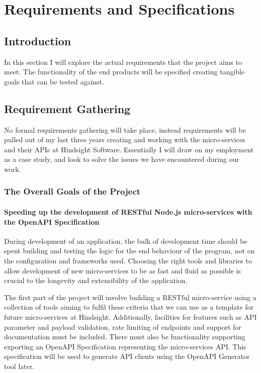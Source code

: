 \chapter{Requirements and Specifications}

\section{Introduction}
In this section I will explore the actual requirements that the project aims to meet. The functionality of the end products will be specified creating tangible goals that can be tested against.
\section{Requirement Gathering}
No formal requirements gathering will take place, instead requirements will be pulled out of my last three years creating and working with the micro-services and their APIs at Hindsight Software. Essentially I will draw on my employment as a case study, and look to solve the issues we have encountered during our work.

\subsection{The Overall Goals of the Project}

\subsubsection{Speeding up the development of RESTful Node.js micro-services with the OpenAPI Specification}
During development of an application, the bulk of development time should be spent building and testing the logic for the end behaviour of the program, not on the configuration and frameworks used. Choosing the right tools and libraries to allow development of new micro-services to be as fast and fluid as possible is crucial to the longevity and extensibility of the application.

The first part of the project will involve building a RESTful micro-service using a collection of tools aiming to fulfil these criteria that we can use as a template for future micro-services at Hindsight. Additionally, facilities for features such as API parameter and payload validation, rate limiting of endpoints and support for documentation must be included. There must also be functionality supporting exporting an OpenAPI Specification representing the micro-services API. This specification will be used to generate API clients using the OpenAPI Generator tool later.

